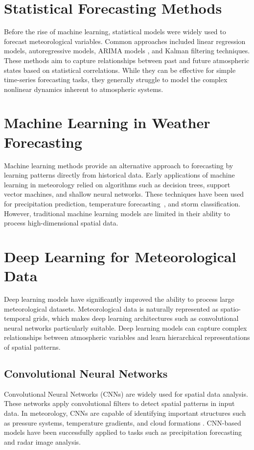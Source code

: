\section{Statistical Forecasting Methods}
Before the rise of machine learning, statistical models were widely used to forecast meteorological variables. Common approaches included linear regression models, autoregressive models, ARIMA models \cite{ForecastingdailymeteorologicaltimeseriesusingARIMA}, and Kalman filtering techniques. These methods aim to capture relationships between past and future atmospheric states based on statistical correlations. While they can be effective for simple time-series forecasting tasks, they generally struggle to model the complex nonlinear dynamics inherent to atmospheric systems.
\section{Machine Learning in Weather Forecasting}
Machine learning methods provide an alternative approach to forecasting by learning patterns directly from historical data. Early applications of machine learning in meteorology relied on algorithms such as decision trees, support vector machines, and shallow neural networks. These techniques have been used for precipitation prediction, temperature forecasting~\cite{AtmosphericTemperaturePredictionusingSupportVectorMachines}, and storm classification. However, traditional machine learning models are limited in their ability to process high-dimensional spatial data.
\section{Deep Learning for Meteorological Data}
Deep learning models have significantly improved the ability to process large meteorological datasets.
Meteorological data is naturally represented as spatio-temporal grids, which makes deep learning architectures such as convolutional neural networks particularly suitable.
Deep learning models can capture complex relationships between atmospheric variables and learn hierarchical representations of spatial patterns.
\subsection{Convolutional Neural Networks}
Convolutional Neural Networks (CNNs) are widely used for spatial data analysis. These networks apply convolutional filters to detect spatial patterns in input data. In meteorology, CNNs are capable of identifying important structures such as pressure systems, temperature gradients, and cloud formations \cite{CNNexemple}. CNN-based models have been successfully applied to tasks such as precipitation forecasting and radar image analysis.
